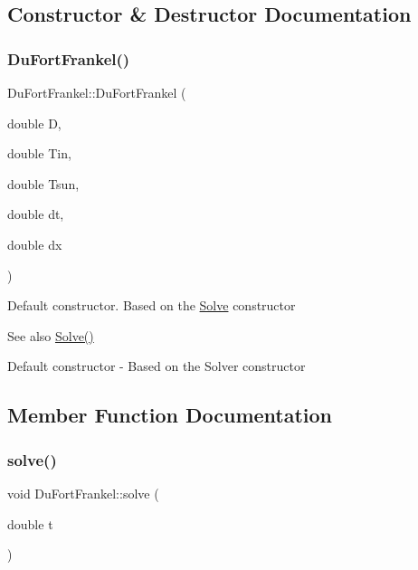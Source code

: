 \subsection{Constructor \& Destructor Documentation}
\mbox{\label{class_du_fort_frankel_ab9a6490d0fd3b08e7e22fba2ade16c19}} 
\subsubsection{\texorpdfstring{Du\+Fort\+Frankel()}{DuFortFrankel()}}
{\footnotesize\ttfamily Du\+Fort\+Frankel\+::\+Du\+Fort\+Frankel (\begin{DoxyParamCaption}\item[{double}]{D,  }\item[{double}]{Tin,  }\item[{double}]{Tsun,  }\item[{double}]{dt,  }\item[{double}]{dx }\end{DoxyParamCaption})}

Default constructor. Based on the \hyperlink{class_solve}{Solve} constructor \begin{DoxySeeAlso}{See also}
\hyperlink{class_solve_a1e0efad6dcf6b09759dd38df7aa08db8}{Solve()}
\end{DoxySeeAlso}
Default constructor -\/ Based on the Solver constructor 

\subsection{Member Function Documentation}
\mbox{\label{class_du_fort_frankel_a73204223c7ace1e3f95e5d89d02c5208}} 
\subsubsection{\texorpdfstring{solve()}{solve()}}
{\footnotesize\ttfamily void Du\+Fort\+Frankel\+::solve (\begin{DoxyParamCaption}\item[{double}]{t }\end{DoxyParamCaption})\hspace{0.3cm}{\ttfamily [virtual]}}

